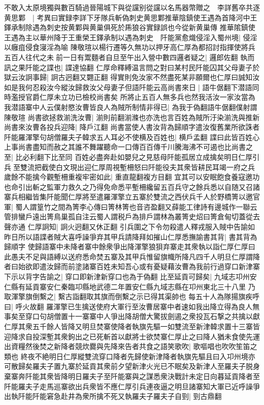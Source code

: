 不敢入太原境獨與數百騎過晉陽城下與從讜别從讜以名馬器幣贈之　李詳舊卒共逐黄思鄴　|{
	考異曰實録李詳下牙隊兵斬偽刺史黄思鄴推華陰鎮使王遇為首降河中王鐸承制除遇為刺史按黄鄴與黄巢俱死於乕狼谷實録誤也今從新黄巢傳}
推華隂鎮使王遇為主以華州降于王重榮王鐸承制以遇為刺史　阡能黨愈熾侵淫入蜀州境|{
	侵淫以癰疽侵食寖淫為喻}
陳敬瑄以楊行遷等久無功以押牙高仁厚為都招討指揮使將兵五百人往代之未前一日有鬻麵者自旦至午出入營中數四邏者疑之|{
	邏郎佐翻}
執而訊之果阡能之諜也|{
	諜達協翻}
仁厚命釋縛温言問之對曰某村民阡能囚其父母妻子於獄云汝詗事歸|{
	詗古迥翻又翾正翻}
得實則免汝家不然盡死某非願爾也仁厚曰誠知汝如是我何忍殺汝今縱汝歸救汝父母妻子但語阡能云高尚書來日|{
	語牛倨翻下潜語同時濫授官爵仁厚未立功已檢校尚書矣}
所將止五百人無多兵也然我活汝一家汝當為我潜語寨中人云僕射愍汝曹皆良人為賊所制情非得已|{
	為我于偽翻語牛倨翻僕射謂陳敬瑄}
尚書欲拯救湔洗汝曹|{
	湔則前翻湔滌也亦洗也言百姓為賊所汙染湔洗與推新}
尚書來汝曹各投兵迎降|{
	降戶江翻}
尚書當使人書汝背為歸順字遣汝復舊業所欲誅者阡能羅渾擎句胡僧羅夫子韓求五人耳必不使横及百姓也|{
	横戶孟翻}
諜曰此皆百姓心上事尚書盡知而赦之其誰不舞躍聽命一口傳百百傳千川騰海沸不可遏也比尚書之至|{
	比必利翻下比至同}
百姓必盡奔赴如嬰兒之見慈母阡能孤居立成擒矣明日仁厚引兵至雙流把截使白文現出迎仁厚周視塹柵怒曰阡能役夫其衆皆耕民耳竭一府之兵歲餘不能擒今觀塹柵重複牢密如此|{
	重直龍翻複方目翻}
宜其可以安眠飽食養寇邀功也命引出斬之監軍力救久之乃得免命悉平塹柵纔留五百兵守之餘兵悉以自随又召諸寨兵相繼皆集阡能聞仁厚將至遣羅渾擎立五寨於雙流之西伏兵千人於野橋箐以邀官軍|{
	蜀人謂篁竹之間為箐李心傳曰箐林箐也音咨盈翻又薛能工律詩有邊城作一聯云管排蠻戶遠出箐鳥巢孤自注云蜀人謂税戶為排戶謂林為叢箐史炤曰箐倉甸切蓋從去聲亦通}
仁厚詗知|{
	詗火迥翻又休正翻}
引兵圍之下令勿殺遣人釋戎服入賊中告諭如昨日所以語諜者賊大喜呼譟爭弃其甲兵請降拜如摧山仁厚悉撫諭書其背|{
	書其背為歸順字}
使歸語寨中未降者寨中餘衆爭出降渾擎狼狽弃寨走其衆執以詣仁厚仁厚曰此愚夫不足與語縛以送府悉命焚五寨及其甲兵惟留旗幟所降凡四千人明旦仁厚謂降者曰始欲即遣汝歸而前塗諸寨百姓未知吾心或有憂疑藉汝曹為我前行過穿口新津寨下示以背字告諭之|{
	穿口即新津新穿口也為于偽翻}
比至延貢可歸矣|{
	九域志卭州安仁縣有延貢寨安仁秦臨卭縣地武德二年置安仁縣九域志縣在卭州東北三十八里}
乃取渾擎旗倒繫之|{
	繫古詣翻取其旗而倒繫之示已得其渠帥也}
每五十人為隊揚旗疾呼曰|{
	呼火故翻}
羅渾擎已生擒送使府大軍行至汝曹居寨中者速如我出降立得為良人無事矣至穿口句胡僧置十一寨寨中人爭出降胡僧大驚拔劍遏之衆投瓦石撃之共擒以獻仁厚其衆五千餘人皆降又明旦焚寨使降者執旗先驅一如雙流至新津韓求置十三寨皆迎降求自投深塹其衆鉤出之已死斬首以獻將士欲焚寨仁厚止之曰降人猶未食使先運出資糧然後焚之新降者競炊爨與先降來告者共食之語笑歌吹|{
	歌嘔唱也吹吹笙笛之類也}
終夜不絶明日仁厚縱雙流穿口降者先歸使新津降者執旗先驅且曰入卭州境亦可散歸矣羅夫子置九寨於延貢其衆前夕望新津火光已不眠矣及新津人至羅夫子脱身棄寨奔阡能其衆皆降明日羅夫子至阡能寨與之謀悉衆決戰計未定日向暮延貢降者至阡能羅夫子走馬巡寨欲出兵衆皆不應仁厚引兵連夜逼之明旦諸寨知大軍已近呼譟爭出執阡能阡能窘急赴井為衆所擒不死又執羅夫子羅夫子自剄|{
	剄古鼎翻}
